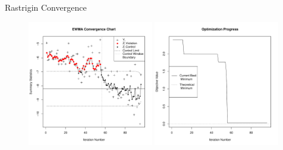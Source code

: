\documentclass[ xcolor = pdftex, dvipsnames, table ]{beamer}
\begin{document}
%
%

\begin{frame}{Rastrigin Convergence}
\begin{figure}[h!]%
        \includegraphics[width=0.49\textwidth]{ewmaConvChartRastHardEnd.pdf}
        \includegraphics[width=0.49\textwidth]{bestZRastHardEnd.pdf}
\end{figure}
\end{frame}
\end{document}
